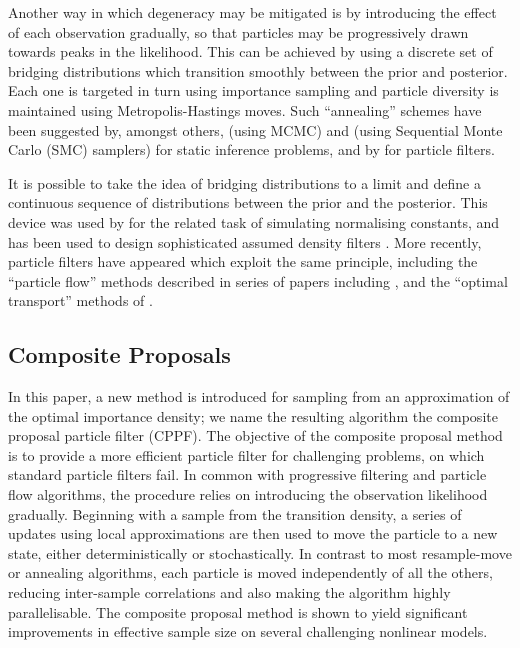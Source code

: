 \documentclass{article}
\begin{document}
Another way in which degeneracy may be mitigated is by introducing the effect of each observation gradually, so that particles may be progressively drawn towards peaks in the likelihood. This can be achieved by using a discrete set of bridging distributions which transition smoothly between the prior and posterior. Each one is targeted in turn using importance sampling and particle diversity is maintained using Metropolis-Hastings moves. Such ``annealing'' schemes have been suggested by, amongst others, \citet{Neal2001} (using MCMC) and \citet{DelMoral2006} (using Sequential Monte Carlo (SMC) samplers) for static inference problems, and by \citet{Godsill2001b,Gall2007,Deutscher2000,Oudjane2000} for particle filters.

It is possible to take the idea of bridging distributions to a limit and define a continuous sequence of distributions between the prior and the posterior. This device was used by \citet{Gelman1998} for the related task of simulating normalising constants, and has been used to design sophisticated assumed density filters \citep{Hanebeck2003a,Hanebeck2012,Hagmar2011}. More recently, particle filters have appeared which exploit the same principle, including the ``particle flow'' methods described in series of papers including \citep{Daum2008,Daum2011d}, and the ``optimal transport'' methods of \cite{Reich2011,Reich2012a}.

\subsection{Composite Proposals}

In this paper, a new method is introduced for sampling from an approximation of the optimal importance density; we name the resulting algorithm the composite proposal particle filter (CPPF). The objective of the composite proposal method is to provide a more efficient particle filter for challenging problems, on which standard particle filters fail. In common with progressive filtering and particle flow algorithms, the procedure relies on introducing the observation likelihood gradually. Beginning with a sample from the transition density, a series of updates using local approximations are then used to move the particle to a new state, either deterministically or stochastically. In contrast to most resample-move or annealing algorithms, each particle is moved independently of all the others, reducing inter-sample correlations and also making the algorithm highly parallelisable. The composite proposal method is shown to yield significant improvements in effective sample size on several challenging nonlinear models.
\end{document}
